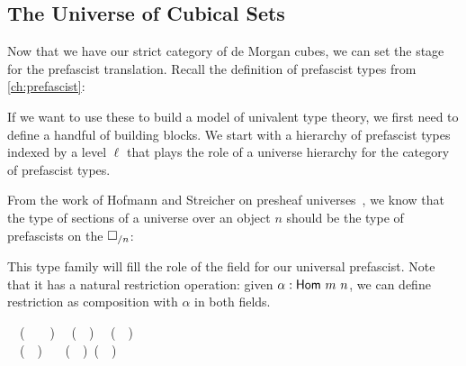 
\subsection{The Universe of Cubical Sets}

Now that we have our strict category of de Morgan cubes, we can set the stage 
for the prefascist translation. Recall the definition 
of prefascist types from \cref{ch:prefascist}:


If we want to use these to build a model of univalent type theory, we first 
need to define a handful of building blocks.
% 
We start with a hierarchy of prefascist types indexed by a level \( \ell \) 
that plays the role of a universe hierarchy for the category of prefascist types.
 
From the work of Hofmann and Streicher on presheaf 
universes~, we know that the type of sections of a 
universe over an object \( n \) should be the type of prefascists on the 
% 
% 
\( \square_{/n} \):


This type family will fill the role of the field  for our universal 
prefascist.
% 
Note that it has a natural restriction operation: given \( \alpha : \func{Hom}~m~n \), 
we can define restriction as composition with \( \alpha \) in both fields.
% 
% 
\begin{code}
\>[0]~\AgdaSymbol{:}~(~\AgdaSymbol{:}~~~)~%
~(~~)~%
~(~~)\<%
\\
\>[0]~~(~~)~%
\AgdaSymbol{=}~~(~~)~(~~)\<%
\end{code}

